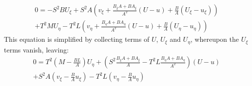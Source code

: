 \[\begin{array}{c}
0 =  - {S^2}B{U_\xi } + {S^2}A\left( {{v_\xi } + \frac{{{B_\xi }A + B{A_\xi }}}{{{A^2}}}\left( {U - u} \right) + \frac{B}{A}\left( {{U_\xi } - {u_\xi }} \right)} \right)\\
 + {T^2}M{U_\eta } - {T^2}L\left( {{v_\eta } + \frac{{{B_\eta }A + B{A_\eta }}}{{{A^2}}}\left( {U - u} \right) + \frac{B}{A}\left( {{U_\eta } - {u_\eta }} \right)} \right)
\end{array}\]
This equation is simplified by collecting terms of $U$, $U_\xi$ and $U_\eta$, whereupon the $U_\xi$ terms vanish, leaving:
\[
\begin{array}{l}
0 = {T^2}\left( {M - \frac{{BL}}{A}} \right){U_\eta } + \left( {{S^2}\frac{{{B_\xi }A + B{A_\xi }}}{A} - {T^2}L\frac{{{B_\eta }A + B{A_\eta }}}{{{A^2}}}} \right)\left( {U - u} \right)\\ + {S^2}A\left( {{v_\xi } - \frac{B}{A}{u_\xi }} \right) - {T^2}L\left( {{v_\eta } - \frac{B}{A}{u_\eta }} \right)
\end{array}\]
